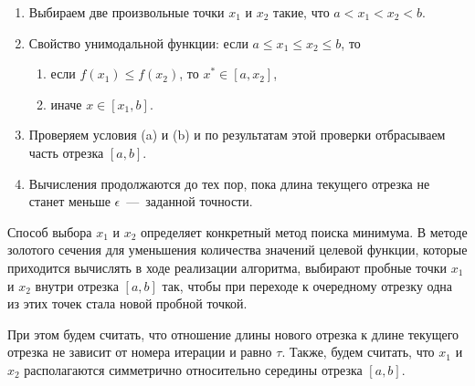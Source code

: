 \begin{enumerate}
	\item Выбираем две произвольные точки $x_1$ и $x_2$ такие, что $a < x_1 < x_2 < b$.
	\item Свойство унимодальной функции:
	если $a \le x_1 \le x_2 \le b$, то

	\begin{enumerate}
		\item если $f(x_1) \le f(x_2)$, то $x^* \in [a, x_2]$,
		\item иначе $x \in [x_1, b]$.
	\end{enumerate}

	\item Проверяем условия (a) и (b) и по результатам этой проверки отбрасываем часть отрезка $[a, b]$.
	\item Вычисления продолжаются до тех пор, пока длина текущего отрезка не станет меньше $\epsilon$~---~заданной точности.
\end{enumerate}

Способ выбора $x_1$ и $x_2$ определяет конкретный метод поиска минимума. В методе золотого сечения для уменьшения количества значений целевой функции, которые приходится вычислять в ходе реализации алгоритма, выбирают пробные точки $x_1$ и $x_2$ внутри отрезка $[a, b]$ так, чтобы при переходе к очередному отрезку одна из этих точек стала новой пробной точкой.

При этом будем считать, что отношение длины нового отрезка к длине текущего отрезка не зависит от номера итерации и равно $\tau$. Также, будем считать, что $x_1$ и $x_2$ располагаются симметрично относительно середины отрезка $[a, b]$.


